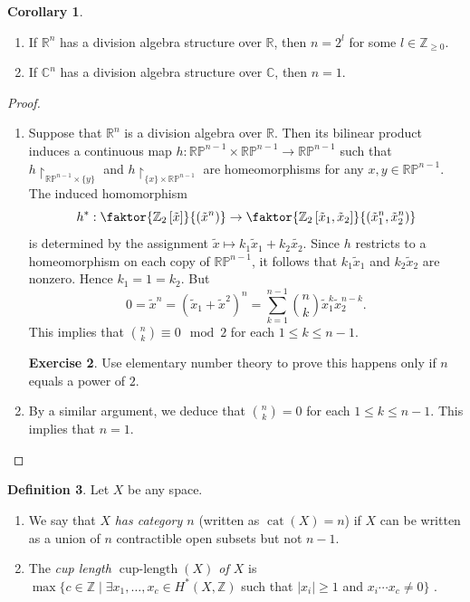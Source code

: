 \documentclass[10pt,letterpaper,cm]{nupset}
\theoremstyle{definition}
\newtheorem{definition}{Definition}[subsection]
\theoremstyle{theorem}
\newtheorem{corollary}[definition]{Corollary}
\newtheorem{exercise}[definition]{Exercise}
\theoremstyle{remark}
\newcommand{\C}{\mathbb C}
\newcommand{\R}{\mathbb{R}}
\newcommand{\RP}{\mathbb{RP}}
\newcommand{\Z}{\mathbb Z}
\newcommand{\1}{\mathbb{1}}
\newcommand{\0}{\vec 0}
\DeclareMathOperator{\clength}{cup{-}length}
\DeclareMathOperator{\cat}{cat}
\begin{document}
\begin{corollary} $ $
\begin{enumerate}
\item If $\R^n$ has a division algebra structure over $\R$, then $n =2^l$ for some $l\in \Z_{\geq 0}$. 
\item If $\C^n$ has a division algebra structure over $\C$, then $n=1$.
\end{enumerate}
\end{corollary}
\begin{proof} $ $
\begin{enumerate}
\item Suppose that $\R^n$ is a division algebra over $\R$. Then its bilinear product induces a continuous map $h: \RP^{n-1} \times \RP^{n-1} \to \RP^{n-1}$ such that $h\restriction_{\RP^{n-1} \times \{y\}}$ and $h\restriction_{\{x\} \times \RP^{n-1}}$ are homeomorphisms for any $x,y \in \RP^{n-1}$. The induced homomorphism $$h^{\ast}: \faktor{\Z_2\left[\tilde{x}\right]}{\left(\tilde{x}^n\right)} \to  \faktor{\Z_2\left[\tilde{x}_1, \tilde{x}_2\right]}{\left(\tilde{x}_1^n, \tilde{x}_2^n\right)}$$ is determined by the assignment $\tilde{x} \mapsto k_1 \tilde{x}_1 + k_2 \tilde{x_2}$. Since $h$ restricts to a homeomorphism on each copy of $\RP^{n-1}$, it follows that $k_1 \tilde{x}_1$ and $k_2\tilde{x}_2$ are nonzero. Hence $k_1 = 1 = k_2$. But $$0 = \tilde{x}^n = \left(\tilde{x}_1 + \tilde{x}^2\right)^n = \sum_{k=1}^{n-1} {n \choose k} \tilde{x}_1^k \tilde{x}_2^{n-k} .$$ This implies that ${n \choose k}\equiv 0 \mod 2$ for each $1\leq k \leq n-1$. 
\begin{exercise}
Use elementary number theory to prove this happens only if $n$ equals a power of $2$.
\end{exercise}
\item By a similar argument, we deduce that ${n \choose k} =  0$ for each $1\leq k \leq n-1$. This implies that $n=1$.
\end{enumerate}
\end{proof}

\begin{definition} Let $X$ be any space.
\begin{enumerate}
\item  We say that $X$ \textit{has category $n$} (written as $\cat(X) = n$) if $X$ can be written as a union of $n$ contractible open subsets but not $n-1$. 
\item The \textit{cup length $\clength(X)$ of $X$} is $ \max\{ c \in \Z \mid \exists x_1, \ldots, x_c \in H^{\ast}(X, \Z)$ such that $\left\lvert{x_i}\right\rvert \geq 1$ and $x_i\cdots x_c \ne 0\}$  .
\end{enumerate}
\end{definition}
\end{document}
